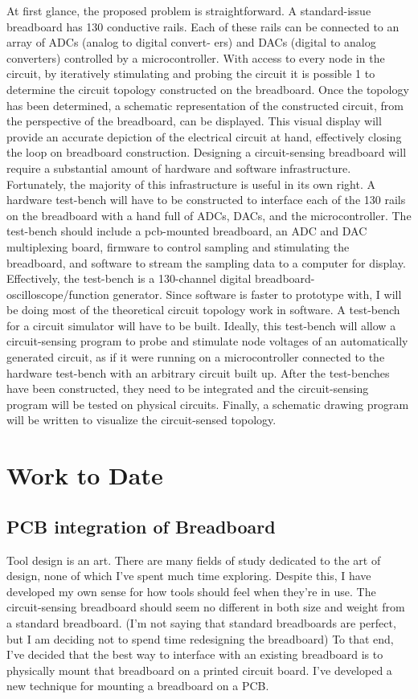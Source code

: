 \documentclass[11pt, a4paper]{article}
\begin{document}
At first glance, the proposed problem is straightforward. 
A standard-issue breadboard has 130 conductive rails. 
Each of these rails can be connected to an array of ADCs (analog to digital convert-
ers) and DACs (digital to analog converters) controlled by a microcontroller. 
With access to every node in the circuit, by iteratively stimulating and probing the circuit it is possible 1 to determine the circuit topology constructed on the breadboard. 
Once the topology has been determined, a schematic representation of the constructed circuit, from the perspective of the breadboard, can be displayed.
This visual display will provide an accurate depiction of the electrical circuit at hand, effectively closing the loop on breadboard construction.
Designing a circuit-sensing breadboard will require a substantial amount of hardware and software infrastructure. 
Fortunately, the majority of this infrastructure is useful in its own right. 
A hardware test-bench will have to be constructed to interface each of the 130 rails on the breadboard with a hand full of ADCs, DACs, and the microcontroller. 
The test-bench should include a pcb-mounted breadboard, an ADC and DAC multiplexing board, firmware to control sampling and stimulating the breadboard, and software to stream the sampling data to a computer for display.
Effectively, the test-bench is a 130-channel digital breadboard-oscilloscope/function generator. 
Since software is faster to prototype with, I will be doing most of the theoretical circuit topology work in software. 
A test-bench for a circuit simulator will have to be built. 
Ideally, this test-bench will allow a circuit-sensing program to probe and stimulate node voltages of an automatically generated circuit, as if it were running on a microcontroller connected to the hardware test-bench with an arbitrary circuit built up.
After the test-benches have been constructed, they need to be integrated and the circuit-sensing program will be tested on physical circuits. 
Finally, a schematic drawing program will be written to visualize the circuit-sensed topology.

\section{Work to Date}
\subsection{PCB integration of Breadboard}

Tool design is an art.
There are many fields of study dedicated to the art of design, none of which I've spent much time exploring.
Despite this, I have developed my own sense for how tools should feel when they're in use.
The circuit-sensing breadboard should seem no different in both size and weight from a standard breadboard.
(I'm not saying that standard breadboards are perfect, but I am deciding not to spend time redesigning the breadboard)
To that end, I've decided that the best way to interface with an existing breadboard is to physically mount that breadboard on a printed circuit board.
I've developed a new technique for mounting a breadboard on a PCB.
\end{document}
